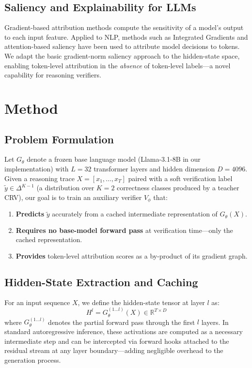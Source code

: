 \documentclass{article}
\begin{document}
\subsection{Saliency and Explainability for LLMs}
Gradient-based attribution methods \citep{baehrens2010explain, simonyan2013deep} compute the sensitivity of a model's output to each input feature. Applied to NLP, methods such as Integrated Gradients \citep{sundararajan2017axiomatic} and attention-based saliency \citep{jain2019attention} have been used to attribute model decisions to tokens. We adapt the basic gradient-norm saliency approach to the hidden-state space, enabling token-level attribution in the \emph{absence} of token-level labels---a novel capability for reasoning verifiers.

\section{Method}
\label{sec:method}

\subsection{Problem Formulation}
Let $G_\theta$ denote a frozen base language model (Llama-3.1-8B in our implementation) with $L = 32$ transformer layers and hidden dimension $D = 4096$. Given a reasoning trace $X = [x_1, \ldots, x_T]$ paired with a soft verification label $\tilde{y} \in \Delta^{K-1}$ (a distribution over $K=2$ correctness classes produced by a teacher CRV), our goal is to train an auxiliary verifier $V_\phi$ that:
\begin{enumerate}[leftmargin=1.5em, topsep=2pt, itemsep=1pt]
  \item \textbf{Predicts} $\tilde{y}$ accurately from a cached intermediate representation of $G_\theta(X)$.
  \item \textbf{Requires no base-model forward pass} at verification time---only the cached representation.
  \item \textbf{Provides} token-level attribution scores as a by-product of its gradient graph.
\end{enumerate}

\subsection{Hidden-State Extraction and Caching}
\label{sec:extraction}

For an input sequence $X$, we define the hidden-state tensor at layer $l$ as:
\begin{equation}
  H^l = G_\theta^{(1 \dots l)}(X) \in \mathbb{R}^{T \times D}
\end{equation}
where $G_\theta^{(1 \dots l)}$ denotes the partial forward pass through the first $l$ layers. In standard autoregressive inference, these activations are computed as a necessary intermediate step and can be intercepted via forward hooks attached to the residual stream at any layer boundary---adding negligible overhead to the generation process.
\end{document}
